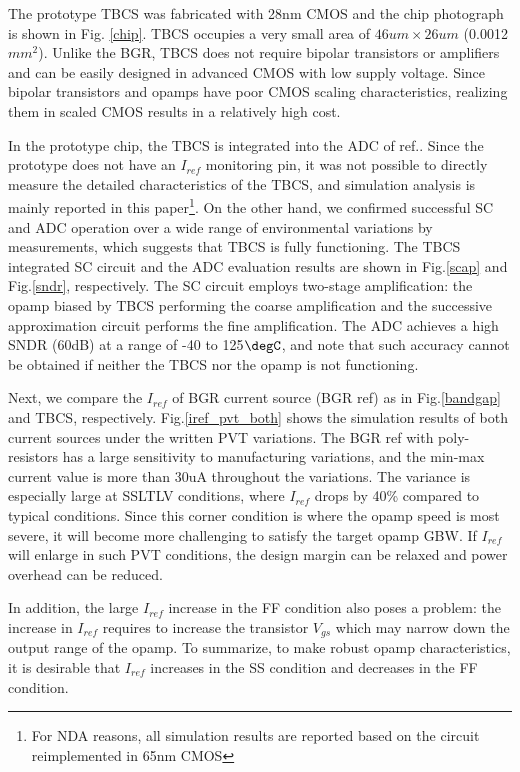 \documentclass[paper]{ieice}
\begin{document}
The prototype TBCS was fabricated with 28nm CMOS and the chip photograph is shown in Fig. \ref{chip}. TBCS occupies a very small area of $46um \times 26um$ (0.0012$mm^2$). Unlike the BGR, TBCS does not require bipolar transistors or amplifiers and can be easily designed in advanced CMOS with low supply voltage. Since bipolar transistors and opamps have poor CMOS scaling characteristics, realizing them in scaled CMOS results in a relatively high cost.

In the prototype chip, the TBCS is integrated into the ADC of ref.\cite{yoshioka201728}. Since the prototype does not have an $I_{ref}$ monitoring pin, it was not possible to directly measure the detailed characteristics of the TBCS, and simulation analysis is mainly reported in this paper\footnote{For NDA reasons, all simulation results are reported based on the circuit reimplemented in 65nm CMOS}. On the other hand, we confirmed successful SC and ADC operation over a wide range of environmental variations by measurements, which suggests that TBCS is fully functioning. The TBCS integrated SC circuit and the ADC evaluation results are shown in Fig.\ref{scap} and Fig.\ref{sndr}, respectively. The SC circuit employs two-stage amplification: the opamp biased by TBCS performing the coarse amplification and the successive approximation circuit performs the fine amplification. The ADC achieves a high SNDR (60dB) at a range of -40 to 125$\degC$, and note that such accuracy cannot be obtained if neither the TBCS nor the opamp is not functioning. 

Next, we compare the $I_{ref}$ of BGR current source (BGR ref) as in Fig.\ref{bandgap} and TBCS, respectively. Fig.\ref{iref_pvt_both} shows the simulation results of both current sources under the written PVT variations. The BGR ref with poly-resistors has a large sensitivity to manufacturing variations, and the min-max current value is more than 30uA throughout the variations. The variance is especially large at SSLTLV conditions, where $I_{ref}$ drops by 40\% compared to typical conditions.
Since this corner condition is where the opamp speed is most severe, it will become more challenging to satisfy the target opamp GBW. If $I_{ref}$ will enlarge in such PVT conditions, the design margin can be relaxed and power overhead can be reduced.

In addition, the large $I_{ref}$ increase in the FF condition also poses a problem: the increase in $I_{ref}$ requires to increase the transistor $V_{gs}$ which may narrow down the output range of the opamp. To summarize, to make robust opamp characteristics, it is desirable that $I_{ref}$ increases in the SS condition and decreases in the FF condition.
\end{document}
